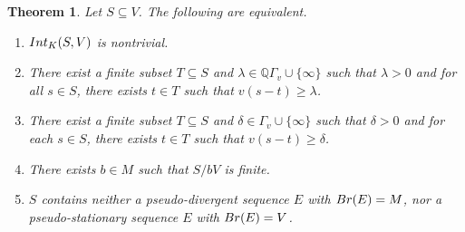 \documentclass{article}
\newtheorem{Thm}[equation]{Theorem}
\theoremstyle{definition}\newtheorem{Def}[equation]{Definition}
\theoremstyle{definition}\newtheorem{Ques}[equation]{Question}
\theoremstyle{definition}\newtheorem{Conj}[equation]{Conjecture}
\theoremstyle{definition}\newtheorem{Not}[equation]{Notation}
\newcommand{\Q}{\mathbb{Q}}
\newcommand{\Int}{\textnormal{Int}}
\newcommand{\Br}{\textnormal{Br}}
\numberwithin{equation}{section}
\begin{document}
\begin{Thm}\label{Int(S,V) nontrivial V1}
Let $S \subseteq V$. The following are equivalent.
\begin{enumerate}[(1)]
\item $\Int_K(S,V)$ is nontrivial.
\item There exist a finite subset $T \subseteq S$ and $\lambda \in \Q\Gamma_v\cup\{\infty\}$ such that $\lambda>0$ and for all $s \in S$, there exists $t \in T$ such that $v(s - t) \geq \lambda$.
\item  There exist a finite subset $T \subseteq S$ and $\delta\in\Gamma_v\cup\{\infty\}$ such that $\delta>0$ and for each $s \in S$, there exists $t \in T$ such that $v(s-t) \geq \delta$.
\item There exists $b \in M$ such that $S/bV$ is finite.
\item $S$ contains neither a pseudo-divergent sequence $E$ with $\Br(E) = M$, nor a pseudo-stationary sequence $E$ with $\Br(E) = V$.
\end{enumerate}
\end{Thm}
\end{document}

